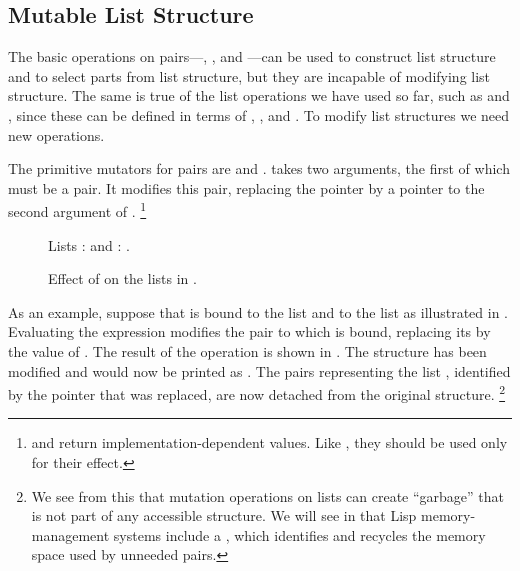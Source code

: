 \subsection{Mutable List Structure}
\label{Section 3.3.1}

The basic operations on pairs---, , and ---can be used to construct list structure and to select parts from list structure, but they are incapable of modifying list structure.
The same is true of the list operations we have used so far, such as  and , since these can be defined in terms of , , and .
To modify list structures we need new operations.

The primitive mutators for pairs are  and .
 takes two arguments, the first of which must be a pair.
It modifies this pair, replacing the  pointer by a pointer to the second argument of .%
\footnote{
	 and  return implementation-dependent values.
	Like , they should be used only for their effect.
}

\begin{figure}[tp]
	\centering
	
	\caption{
		Lists :  and : .
	}
	\label{Figure 3.12}
\end{figure}

\begin{figure}[bp]
	\centering
	
	\caption{
		Effect of  on the lists in .
	}
	\label{Figure 3.13}
\end{figure}

As an example, suppose that  is bound to the list  and  to the list  as illustrated in .
Evaluating the expression  modifies the pair to which  is bound, replacing its  by the value of .
The result of the operation is shown in .
The structure  has been modified and would now be printed as .
The pairs representing the list , identified by the pointer that was replaced, are now detached from the original structure.%
\footnote{
	We see from this that mutation operations on lists can create “garbage” that is not part of any accessible structure.
	We will see in  that Lisp memory-management systems include a , which identifies and recycles the memory space used by unneeded pairs.
}

